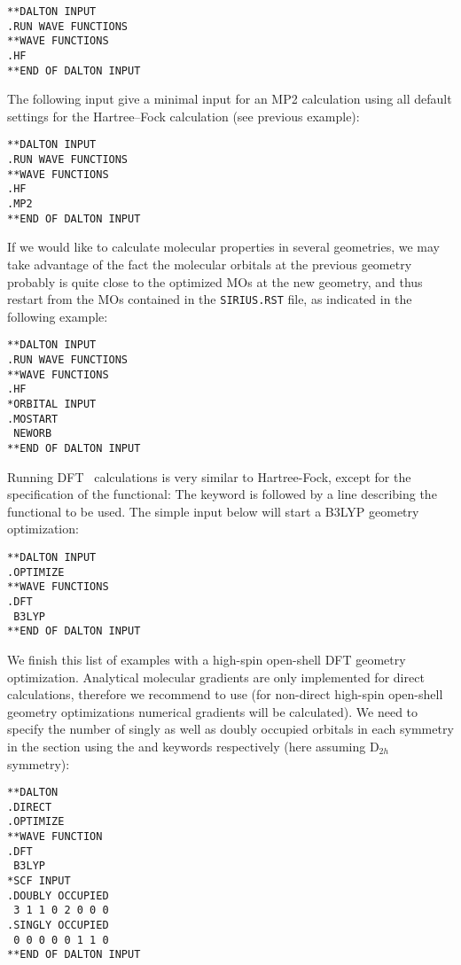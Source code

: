 \begin{verbatim}
**DALTON INPUT
.RUN WAVE FUNCTIONS
**WAVE FUNCTIONS
.HF
**END OF DALTON INPUT
\end{verbatim}
\label{sirius_ex1a}

The following input give a minimal input for an
MP2
calculation using all default settings for the Hartree--Fock
calculation (see previous example):

\begin{verbatim}
**DALTON INPUT
.RUN WAVE FUNCTIONS
**WAVE FUNCTIONS
.HF
.MP2
**END OF DALTON INPUT
\end{verbatim}
\label{sirius_ex1b}

If we would like to calculate molecular properties in several
geometries, we may take advantage of the fact the molecular
orbitals at the previous geometry probably is quite close to the
optimized MOs at the new geometry, and thus restart
from the MOs contained in the \verb|SIRIUS.RST|
file, as indicated in the following example:

\begin{verbatim}
**DALTON INPUT
.RUN WAVE FUNCTIONS
**WAVE FUNCTIONS
.HF
*ORBITAL INPUT
.MOSTART
 NEWORB
**END OF DALTON INPUT
\end{verbatim}
\label{sirius_ex2}

Running DFT~ calculations is very similar to Hartree-Fock, except for
the specification of the functional: The  keyword is followed by a
line describing the functional to be used. The simple input below will
start a B3LYP geometry optimization:
\begin{verbatim}
**DALTON INPUT
.OPTIMIZE
**WAVE FUNCTIONS
.DFT
 B3LYP
**END OF DALTON INPUT
\end{verbatim}

We finish this list of examples with a high-spin open-shell DFT geometry optimization.
Analytical molecular gradients are only implemented for direct calculations,
therefore we recommend to use 
(for non-direct high-spin open-shell geometry optimizations numerical gradients will be calculated).
We need to specify the number of singly as well as doubly occupied orbitals 
in each symmetry in the  section using the 
and  keywords respectively
(here assuming D$_{2h}$ symmetry):
\begin{verbatim}
**DALTON
.DIRECT
.OPTIMIZE
**WAVE FUNCTION
.DFT
 B3LYP
*SCF INPUT
.DOUBLY OCCUPIED
 3 1 1 0 2 0 0 0
.SINGLY OCCUPIED
 0 0 0 0 0 1 1 0
**END OF DALTON INPUT
\end{verbatim}

